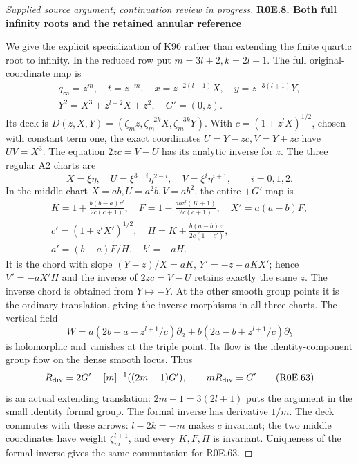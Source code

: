 \begin{proof}[Supplied source argument; continuation review in progress]
\medskip\noindent\textbf{R0E.8. Both full infinity roots and the retained annular reference}

\par\nobreak

We give the explicit specialization of K96 rather than extending the
finite quartic root to infinity. In the reduced row put
\(m=3l+2,k=2l+1\). The full original-coordinate map is
\[
 \begin{gathered}
 q_\infty=z^m,\quad t=z^{-m},\quad
 x=z^{-2(l+1)}X,\quad y=z^{-3(l+1)}Y,\\
 Y^2=X^3+z^{l+2}X+z^2,\quad G'=(0,z).
 \end{gathered}\tag{R0E.59}
\]
Its deck is \(D(z,X,Y)=(\zeta_mz,\zeta_m^{-2k}X,
\zeta_m^{-3k}Y)\). With \(c=(1+z^lX)^{1/2}\), chosen with
constant term one, the exact coordinates
\(U=Y-zc,V=Y+zc\) have \(UV=X^3\). The equation
\(2zc=V-U\) has its analytic inverse for \(z\). The three regular
A2 charts are
\[
 X=\xi\eta,\quad U=\xi^{3-i}\eta^{2-i},\quad
 V=\xi^i\eta^{i+1},\qquad i=0,1,2.
 \tag{R0E.60}
\]
In the middle chart \(X=ab,U=a^2b,V=ab^2\), the entire \(+G'\)
map is
\[
 \begin{gathered}
 K=1+\frac{b(b-a)z^l}{2c(c+1)},\quad
 F=1-\frac{abz^l(K+1)}{2c(c+1)},\quad X'=a(a-b)F,\\
 c'=(1+z^lX')^{1/2},\quad
 H=K+\frac{b(a-b)z^l}{2c(1+c')},\\
 a'=(b-a)F/H,\quad b'=-aH.
 \end{gathered}                                                   \tag{R0E.61}
\]
It is the chord with slope \((Y-z)/X=aK\),
\(Y'=-z-aKX'\); hence \(V'=-aX'H\) and the inverse of
\(2zc=V-U\) retains exactly the same \(z\). The inverse chord
is obtained from \(Y\mapsto-Y\). At the other smooth group points
it is the ordinary translation, giving the inverse morphisms in
all three charts. The vertical field
\[
 W=a(2b-a-z^{l+1}/c)\partial_a+
   b(2a-b+z^{l+1}/c)\partial_b
 \tag{R0E.62}
\]
is holomorphic and vanishes at the triple point. Its flow is the
identity-component group flow on the dense smooth locus. Thus
\[
 R_{\rm div}=2G'-[m]^{-1}((2m-1)G'),\qquad mR_{\rm div}=G'
 \tag{R0E.63}
\]
is an actual extending translation: \(2m-1=3(2l+1)\) puts the
argument in the small identity formal group. The formal inverse
has derivative \(1/m\). The deck commutes with these arrows:
\(l-2k=-m\) makes \(c\) invariant; the two middle coordinates
have weight \(\zeta_m^{l+1}\), and every \(K,F,H\) is invariant.
Uniqueness of the formal inverse gives the same commutation for
R0E.63.


\end{proof}
